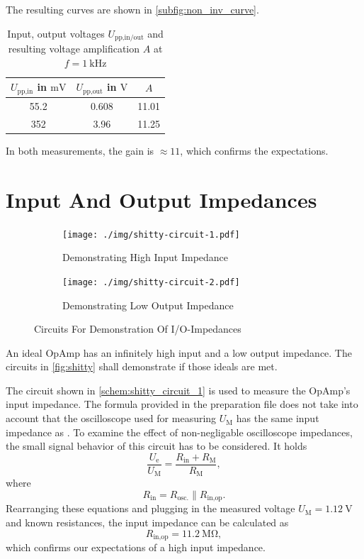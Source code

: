 The resulting curves are shown in \autoref{subfig:non_inv_curve}.
\begin{table}[tbp]
	\centering
	\caption{Input, output voltages $U_\text{pp,in/out}$ and resulting voltage amplification $A$ at $f=\SI{1}{\kilo\hertz}$}
	\label{tab:non_inv_vals}
	\begin{tabular}{SSS}
		\toprule
		{$U_\text{pp,in}$ in $\si{\milli\volt}$}&	{$U_\text{pp,out}$ in $\si{\volt}$}&	{$A$}\\
		\midrule
		\num{55.2}	&	\num{0.608}	&	\num{11.01}\\
		\num{352}	&	\num{3.96}	&	\num{11.25}\\
		\bottomrule
	\end{tabular}
\end{table}
In both measurements, the gain is $\approx 11$, which confirms the expectations.

\section{Input And Output Impedances}
\begin{figure}[tbp]
	\centering
	\begin{subfigure}{0.4\textwidth}
		\centering
		\texttt{[image: ./img/shitty-circuit-1.pdf]}
		\caption{Demonstrating High Input Impedance}
		\label{schem:shitty_circuit_1}
	\end{subfigure}
	\begin{subfigure}{0.4\textwidth}
		\centering
		\texttt{[image: ./img/shitty-circuit-2.pdf]}
		\caption{Demonstrating Low Output Impedance}
		\label{schem:shitty_circuit_2}
	\end{subfigure}
	\caption{Circuits For Demonstration Of I/O-Impedances}
	\label{fig:shitty}
\end{figure}
An ideal OpAmp has an infinitely high input and a low output impedance.
The circuits in \autoref{fig:shitty} shall demonstrate if those ideals are met.

The circuit shown in \autoref{schem:shitty_circuit_1} is used to measure the OpAmp's input impedance.
The formula provided in the preparation file does not take into account that the oscilloscope used for measuring $U_\text{M}$ has the same input impedance as .
To examine the effect of non-negligable oscilloscope impedances, the small signal behavior of this circuit has to be considered.
It holds
\begin{equation*}
	\frac{U_\text{e}}{U_\text{M}}=\frac{R_\text{in}+R_\text{M}}{R_\text{M}},
\end{equation*}
where
\begin{equation*}
	R_\text{in}=R_\text{osc.}\| R_\text{in,op}.
\end{equation*}
Rearranging these equations and plugging in the measured voltage $U_\text{M}=\SI{1.12}{\volt}$ and known resistances, the input impedance can be calculated as
\begin{equation*}
	R_\text{in,op}=\SI{11.2}{\mega\ohm},
\end{equation*}
which confirms our expectations of a high input impedance.

